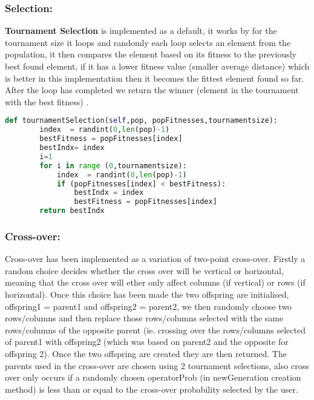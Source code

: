 \documentclass{article}
\begin{document}
\subsubsection*{Selection:}
\textbf{Tournament Selection} is implemented as a default, it works by for the tournament size it loops and randomly each loop selects an element from the population, it then compares the element based on its fitness to the previously best found element, if it has a lower fitness value (smaller average distance) which is better in this implementation then it becomes the fittest element found so far. After the loop has completed we return the winner (element in the tournament with the best fitness) .


\begin{lstlisting}[language=Python]
def tournamentSelection(self,pop, popFitnesses,tournamentsize):
        index  = randint(0,len(pop)-1)
        bestFitness = popFitnesses[index]
        bestIndx= index
        i=1
        for i in range (0,tournamentsize):
            index  = randint(0,len(pop)-1)
            if (popFitnesses[index] < bestFitness):
                bestIndx = index
                bestFitness = popFitnesses[index]
        return bestIndx
\end{lstlisting}

\subsubsection*{Cross-over:}
Cross-over has been implemented as a variation of two-point cross-over. Firstly a random choice decides whether the cross over will be vertical or horizontal, meaning that the cross over will ether only affect columns (if vertical) or rows (if horizontal). Once this choice has been made the two offspring are initialised, offspring1 = parent1 and offspring2 = parent2, we then randomly choose two rows/columns and then replace those rows/columns selected with the same rows/columns of the opposite parent (ie. crossing over the rows/columns selected of parent1 with offspring2 (which was based on parent2 and the opposite for offspring 2). Once the two offspring are created they are then returned. The parents used in the cross-over are chosen using 2 tournament selections, also cross over only occurs if a randomly chosen operatorProb (in newGeneration creation method) is less than or equal to the cross-over probability selected by the user.
\end{document}
